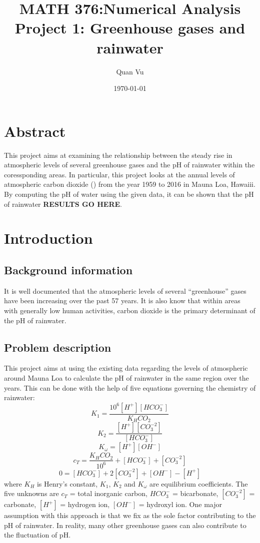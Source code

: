 \documentclass{article}
\title{%
	MATH 376:Numerical Analysis \\
	\large  Project 1: Greenhouse gases and rainwater
	}
\author{Quan Vu}
\date{\today}
\begin{document}
	\maketitle
	
	\section{Abstract}
	This project aims at examining the relationship between the steady 	rise in atmospheric levels of several greenhouse gases and the pH of rainwater within the coressponding areas. In particular, this project looks at the annual levels of atmospheric carbon dioxide () from the year 1959 to 2016 in Mauna Loa, Hawaiii. By computing the pH of water using the given data, it can be shown that the pH of rainwater \textbf{RESULTS GO HERE}.
	
	\section{Introduction}
	
	\subsection{Background information}
	It is well documented that the atmospheric levels of several “greenhouse” gases have been increasing over the past 57 years. It is also know that within areas with generally low human activities, carbon dioxide is the primary determinant of the pH of rainwater.
	
	\subsection{Problem description}
	This project aims at using the existing data regarding the levels of atmospheric  around Mauna Loa to calculate the pH of rainwater in the same region over the years. This can be done with the help of five equations governing the chemistry of rainwater:
	\[ K_1 = \frac{10^6[H^+][HCO_3^-]}{K_HCO_2} \tag{1} \]
	\[ K_2 = \frac{[H^+][CO_3^{-2}]}{[HCO_3^-]} \tag{2} \]
	\[ K_\omega = [H^+][OH^-] \tag{3} \]
	\[ c_T = \frac{K_HCO_2}{10^6} + [HCO_3^-] + [CO_3^{-2}] \tag{4} \]
	\[ 0 = [HCO_3^-] + 2[CO_3^{-2}] + [OH^-] - [H^+] \tag{5} \]
	where ${K_H}$ is Henry's constant, ${K_1}$, ${K_2}$ and ${K_\omega}$ are equilibrium coefficients. The five unknowns are ${c_T}$ = total inorganic carbon, ${HCO_3^-}$ = bicarbonate, ${[CO_3^{-2}]}$ = carbonate, ${[H^+]}$ = hydrogen ion, ${[OH^-]}$ = hydroxyl ion.
	One major assumption with this approach is that we fix  as the sole factor contributing to the pH of rainwater. In reality, many other greenhouse gases can also contribute to the fluctuation of pH.
\end{document}
